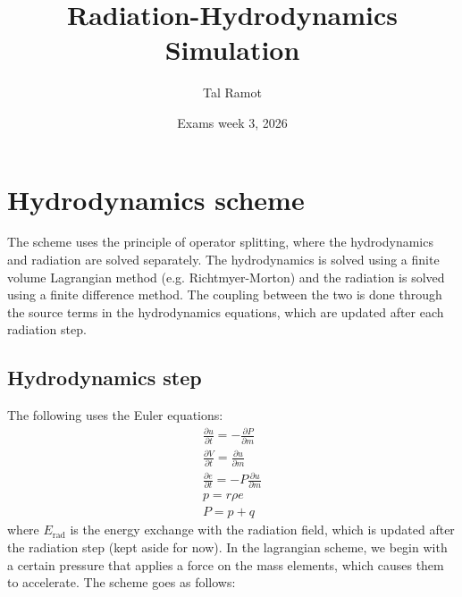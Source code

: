 \documentclass[11pt]{article}
\title{Radiation-Hydrodynamics Simulation}
\author{Tal Ramot}
\date{Exams week 3, 2026}
\begin{document}
\maketitle

\section{Hydrodynamics scheme}
The scheme uses the principle of operator splitting, where the hydrodynamics and radiation are solved separately. The hydrodynamics is solved using a finite volume Lagrangian method (e.g. Richtmyer-Morton) and the radiation is solved using a finite difference method. The coupling between the two is done through the source terms in the hydrodynamics equations, which are updated after each radiation step.
\subsection{Hydrodynamics step}
The following uses the Euler equations:
\begin{gather}
  \frac{\partial u}{\partial t} = - \frac{\partial P}{\partial m} \\
  \frac{\partial V}{\partial t} = \frac{\partial u}{\partial m} \\
  \frac{\partial e}{\partial t} = -P \frac{\partial u}{\partial m} \\
  p = r \rho e \\
  P = p + q
\end{gather}
where $E_{\text{rad}}$ is the energy exchange with the radiation field, which is updated after the radiation step (kept aside for now). 
In the lagrangian scheme, we begin with a certain pressure that applies a force on the mass elements, which causes them to accelerate. The scheme goes as follows:
\end{document}
